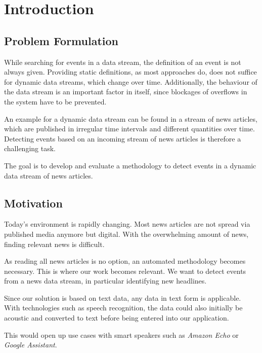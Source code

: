 \section{Introduction}
\label{sec:1_introduction}

\subsection{Problem Formulation}
\label{subsec:1_problem_formulation}

While searching for events in a data stream, the definition of an event is not always given.
Providing static definitions, as most approaches do,
does not suffice for dynamic data streams, which change over time.
Additionally, the behaviour of the data stream is an important factor in itself,
since blockages of overflows in the system have to be prevented.

An example for a dynamic data stream can be found in a stream of news articles,
which are published in irregular time intervals and different quantities over time.
Detecting events based on an incoming stream of news articles is therefore a challenging task.

The goal is to develop and evaluate a methodology to detect events in a dynamic data stream of news articles.

\subsection{Motivation}
\label{subsec:1_motivation}

Today's environment is rapidly changing.
Most news articles are not spread via published media anymore but digital.
With the overwhelming amount of news, finding relevant news is difficult.

As reading all news articles is no option, an automated methodology becomes necessary.
This is where our work becomes relevant.
We want to detect events from a news data stream, in particular identifying new headlines.

Since our solution is based on text data, any data in text form is applicable.
With technologies such as speech recognition, the data could also initially be acoustic
and converted to text before being entered into our application.

This would open up use cases with smart speakers such as \textit{Amazon Echo} or \textit{Google Assistant}.
